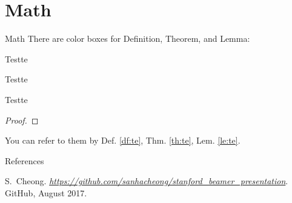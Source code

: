 \documentclass[pdf]{beamer}
\newcommand{\empr}[1]{{\color{DKUDarkBlue}\emph{#1}}}
\theoremstyle{remark}
\theoremstyle{definition}
\begin{document}
\section{Math}
\begin{frame}{Math}
There are color boxes for Definition, Theorem, and Lemma:
\begin{defi}{Test}{te}
\end{defi}
\begin{thm}{Test}{te}
\end{thm}
\begin{lem}{Test}{te}
\end{lem}
\begin{proof}
\end{proof}

You can refer to them by Def. \ref{df:te}, Thm. \ref{th:te}, Lem. \ref{le:te}. 
\end{frame}



\begin{frame}{References}
\begin{thebibliography}{3}
	S.~Cheong. \empr{\href{https://github.com/sanhacheong/stanford_beamer_template}{https://github.com/sanhacheong/stanford\_beamer\_presentation}}. {GitHub}, August 2017.
\end{thebibliography}
\end{frame}
\end{document}
